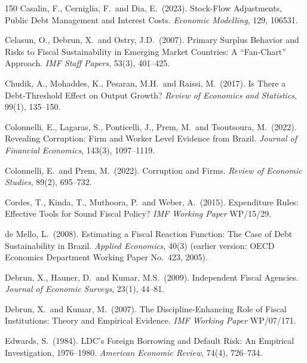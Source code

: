 \documentclass[11pt,a4paper]{article}
\begin{document}
\begin{thebibliography}{150}
 Casalin, F., Cerniglia, F.\ and Dia, E.\ (2023). Stock-Flow Adjustments, Public Debt Management and Interest Costs. \textit{Economic Modelling}, 129, 106531.

 Celasun, O., Debrun, X.\ and Ostry, J.D.\ (2007). Primary Surplus Behavior and Risks to Fiscal Sustainability in Emerging Market Countries: A ``Fan-Chart'' Approach. \textit{IMF Staff Papers}, 53(3), 401--425.

 Chudik, A., Mohaddes, K., Pesaran, M.H.\ and Raissi, M.\ (2017). Is There a Debt-Threshold Effect on Output Growth? \textit{Review of Economics and Statistics}, 99(1), 135--150.

 Colonnelli, E., Lagaras, S., Ponticelli, J., Prem, M.\ and Tsoutsoura, M.\ (2022). Revealing Corruption: Firm and Worker Level Evidence from Brazil. \textit{Journal of Financial Economics}, 143(3), 1097--1119.

 Colonnelli, E.\ and Prem, M.\ (2022). Corruption and Firms. \textit{Review of Economic Studies}, 89(2), 695--732.

 Cordes, T., Kinda, T., Muthoora, P.\ and Weber, A.\ (2015). Expenditure Rules: Effective Tools for Sound Fiscal Policy? \textit{IMF Working Paper} WP/15/29.

 de Mello, L.\ (2008). Estimating a Fiscal Reaction Function: The Case of Debt Sustainability in Brazil. \textit{Applied Economics}, 40(3) (earlier version: OECD Economics Department Working Paper No.\ 423, 2005).

 Debrun, X., Hauner, D.\ and Kumar, M.S.\ (2009). Independent Fiscal Agencies. \textit{Journal of Economic Surveys}, 23(1), 44--81.

 Debrun, X.\ and Kumar, M.\ (2007). The Discipline-Enhancing Role of Fiscal Institutions: Theory and Empirical Evidence. \textit{IMF Working Paper} WP/07/171.

 Edwards, S.\ (1984). LDC's Foreign Borrowing and Default Risk: An Empirical Investigation, 1976--1980. \textit{American Economic Review}, 74(4), 726--734.


\end{thebibliography}
\end{document}
